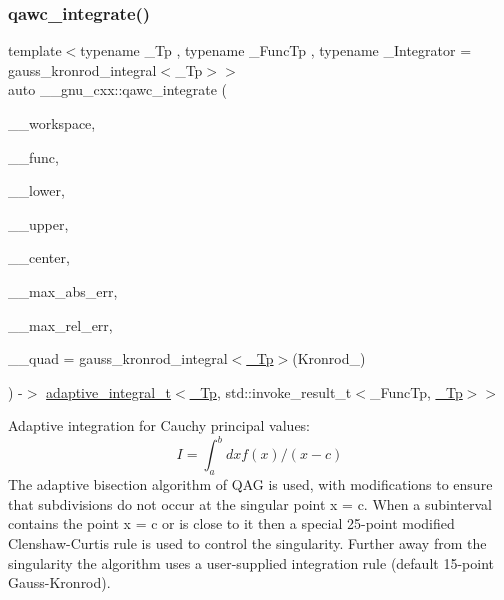\subsubsection{\texorpdfstring{qawc\+\_\+integrate()}{qawc\_integrate()}}
{\footnotesize\ttfamily template$<$typename \+\_\+\+Tp , typename \+\_\+\+Func\+Tp , typename \+\_\+\+Integrator  = gauss\+\_\+kronrod\+\_\+integral$<$\+\_\+\+Tp$>$$>$ \\
auto \+\_\+\+\_\+gnu\+\_\+cxx\+::qawc\+\_\+integrate (\begin{DoxyParamCaption}\item[{\hyperlink{class____gnu__cxx_1_1integration__workspace}{integration\+\_\+workspace}$<$ \hyperlink{namespace____gnu__cxx_a3b19a9c800ca194374ef9172290f7d79}{\+\_\+\+Tp}, std\+::invoke\+\_\+result\+\_\+t$<$ \+\_\+\+Func\+Tp, \hyperlink{namespace____gnu__cxx_a3b19a9c800ca194374ef9172290f7d79}{\+\_\+\+Tp} $>$$>$ \&}]{\+\_\+\+\_\+workspace,  }\item[{\+\_\+\+Func\+Tp}]{\+\_\+\+\_\+func,  }\item[{\hyperlink{namespace____gnu__cxx_a3b19a9c800ca194374ef9172290f7d79}{\+\_\+\+Tp}}]{\+\_\+\+\_\+lower,  }\item[{\hyperlink{namespace____gnu__cxx_a3b19a9c800ca194374ef9172290f7d79}{\+\_\+\+Tp}}]{\+\_\+\+\_\+upper,  }\item[{\hyperlink{namespace____gnu__cxx_a3b19a9c800ca194374ef9172290f7d79}{\+\_\+\+Tp}}]{\+\_\+\+\_\+center,  }\item[{\hyperlink{namespace____gnu__cxx_a3b19a9c800ca194374ef9172290f7d79}{\+\_\+\+Tp}}]{\+\_\+\+\_\+max\+\_\+abs\+\_\+err,  }\item[{\hyperlink{namespace____gnu__cxx_a3b19a9c800ca194374ef9172290f7d79}{\+\_\+\+Tp}}]{\+\_\+\+\_\+max\+\_\+rel\+\_\+err,  }\item[{\+\_\+\+Integrator}]{\+\_\+\+\_\+quad = {\ttfamily gauss\+\_\+kronrod\+\_\+integral$<$\hyperlink{namespace____gnu__cxx_a3b19a9c800ca194374ef9172290f7d79}{\+\_\+\+Tp}$>$(Kronrod\+\_)} }\end{DoxyParamCaption}) -\/$>$ \hyperlink{struct____gnu__cxx_1_1adaptive__integral__t}{adaptive\+\_\+integral\+\_\+t}$<$\hyperlink{namespace____gnu__cxx_a3b19a9c800ca194374ef9172290f7d79}{\+\_\+\+Tp}, std\+::invoke\+\_\+result\+\_\+t$<$\+\_\+\+Func\+Tp, \hyperlink{namespace____gnu__cxx_a3b19a9c800ca194374ef9172290f7d79}{\+\_\+\+Tp}$>$$>$
    }

Adaptive integration for Cauchy principal values\+: \[ I = \int_a^b dx f(x) / (x - c) \] The adaptive bisection algorithm of Q\+AG is used, with modifications to ensure that subdivisions do not occur at the singular point x = c. When a subinterval contains the point x = c or is close to it then a special 25-\/point modified Clenshaw-\/\+Curtis rule is used to control the singularity. Further away from the singularity the algorithm uses a user-\/supplied integration rule (default 15-\/point Gauss-\/\+Kronrod). 

